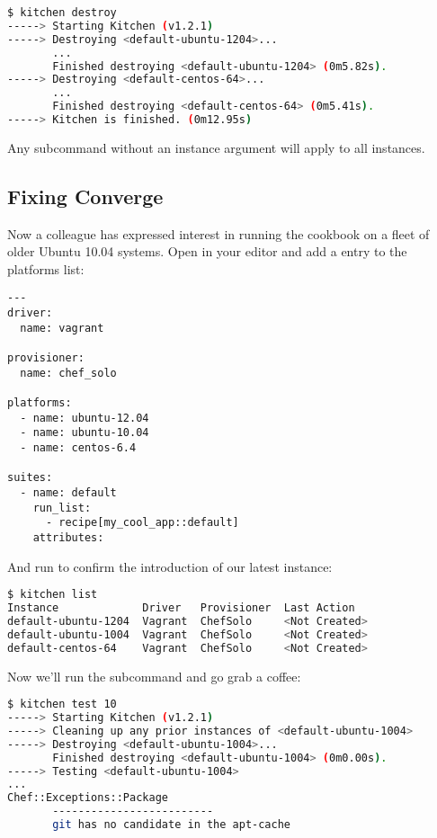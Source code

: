 \begin{lstlisting}[language=Bash,label=lst:testing-test-kitchen25]
$ kitchen destroy
-----> Starting Kitchen (v1.2.1)
-----> Destroying <default-ubuntu-1204>...
       ...
       Finished destroying <default-ubuntu-1204> (0m5.82s).
-----> Destroying <default-centos-64>...
       ...
       Finished destroying <default-centos-64> (0m5.41s).
-----> Kitchen is finished. (0m12.95s)
\end{lstlisting}

Any  subcommand without an instance argument will apply to all instances.



\subsection{Fixing Converge}

Now a colleague has expressed interest in running the cookbook on a fleet of older Ubuntu 10.04 systems. Open  in your editor and add a  entry to the platforms list:

\begin{lstlisting}[label=lst:testing-test-kitchen26]
---
driver:
  name: vagrant

provisioner:
  name: chef_solo

platforms:
  - name: ubuntu-12.04
  - name: ubuntu-10.04
  - name: centos-6.4

suites:
  - name: default
    run_list:
      - recipe[my_cool_app::default]
    attributes:
\end{lstlisting}

And run  to confirm the introduction of our latest instance:

\begin{lstlisting}[language=Bash,label=lst:testing-test-kitchen27]
$ kitchen list
Instance             Driver   Provisioner  Last Action
default-ubuntu-1204  Vagrant  ChefSolo     <Not Created>
default-ubuntu-1004  Vagrant  ChefSolo     <Not Created>
default-centos-64    Vagrant  ChefSolo     <Not Created>
\end{lstlisting}

Now we'll run the  subcommand and go grab a coffee:

\begin{lstlisting}[language=Bash,label=lst:testing-test-kitchen28]
$ kitchen test 10
-----> Starting Kitchen (v1.2.1)
-----> Cleaning up any prior instances of <default-ubuntu-1004>
-----> Destroying <default-ubuntu-1004>...
       Finished destroying <default-ubuntu-1004> (0m0.00s).
-----> Testing <default-ubuntu-1004>
...
Chef::Exceptions::Package
       -------------------------
       git has no candidate in the apt-cache
\end{lstlisting}

